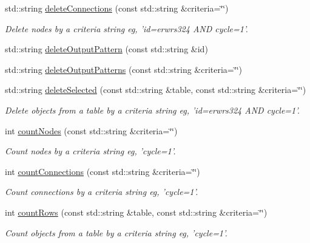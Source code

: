 \begin{DoxyCompactItemize}
std\-::string \hyperlink{classcryomesh_1_1manager_1_1DatabaseManager_a15dfa7b9dbf0164d7f37e6546f368e38}{delete\-Connections} (const std\-::string \&criteria=\char`\"{}\char`\"{})
\begin{DoxyCompactList}\small\item\em \-Delete nodes by a criteria string eg, 'id=erwrs324 \-A\-N\-D cycle=1'. \end{DoxyCompactList}\item 
std\-::string \hyperlink{classcryomesh_1_1manager_1_1DatabaseManager_aa843bb7f909b2b47437a9597a8966786}{delete\-Output\-Pattern} (const std\-::string \&id)
\item 
std\-::string \hyperlink{classcryomesh_1_1manager_1_1DatabaseManager_ae0bdd63971d6363c6525136264def2c9}{delete\-Output\-Patterns} (const std\-::string \&criteria=\char`\"{}\char`\"{})
\item 
std\-::string \hyperlink{classcryomesh_1_1manager_1_1DatabaseManager_ae7a0c296543488886e60e4cb73a4cf95}{delete\-Selected} (const std\-::string \&table, const std\-::string \&criteria=\char`\"{}\char`\"{})
\begin{DoxyCompactList}\small\item\em \-Delete objects from a table by a criteria string eg, 'id=erwrs324 \-A\-N\-D cycle=1'. \end{DoxyCompactList}\item 
int \hyperlink{classcryomesh_1_1manager_1_1DatabaseManager_a8c2a8fe55d1df17b9ed35bfa0a625390}{count\-Nodes} (const std\-::string \&criteria=\char`\"{}\char`\"{})
\begin{DoxyCompactList}\small\item\em \-Count nodes by a criteria string eg, 'cycle=1'. \end{DoxyCompactList}\item 
int \hyperlink{classcryomesh_1_1manager_1_1DatabaseManager_a40f5c4b6df9c281e1f667f27c18aacba}{count\-Connections} (const std\-::string \&criteria=\char`\"{}\char`\"{})
\begin{DoxyCompactList}\small\item\em \-Count connections by a criteria string eg, 'cycle=1'. \end{DoxyCompactList}\item 
int \hyperlink{classcryomesh_1_1manager_1_1DatabaseManager_a5aefac8742cb35d27d2df611658fe10b}{count\-Rows} (const std\-::string \&table, const std\-::string \&criteria=\char`\"{}\char`\"{})
\begin{DoxyCompactList}\small\item\em \-Count objects from a table by a criteria string eg, 'cycle=1'. \end{DoxyCompactList}\item 

\end{DoxyCompactItemize}
